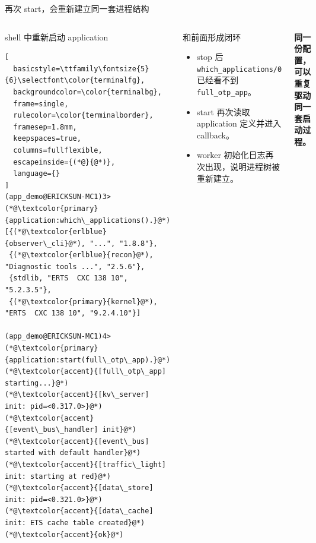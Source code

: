 \documentclass[aspectratio=169, 9pt]{beamer}
\newcommand{\good}[1]{\textbf{\color{accent!80!black}#1}}
\newcommand{\code}[1]{\texttt{#1}}
\begin{document}
\begin{frame}[fragile]{再次 start，会重新建立同一套进程结构}
  \begin{columns}[T,onlytextwidth]
    \begin{block}{shell 中重新启动 application}
\begin{lstlisting}[
  basicstyle=\ttfamily\fontsize{5}{6}\selectfont\color{terminalfg},
  backgroundcolor=\color{terminalbg},
  frame=single,
  rulecolor=\color{terminalborder},
  framesep=1.8mm,
  keepspaces=true,
  columns=fullflexible,
  escapeinside={(*@}{@*)},
  language={}
]
(app_demo@ERICKSUN-MC1)3> (*@\textcolor{primary}{application:which\_applications().}@*)
[{(*@\textcolor{erlblue}{observer\_cli}@*), "...", "1.8.8"},
 {(*@\textcolor{erlblue}{recon}@*), "Diagnostic tools ...", "2.5.6"},
 {stdlib, "ERTS  CXC 138 10", "5.2.3.5"},
 {(*@\textcolor{primary}{kernel}@*), "ERTS  CXC 138 10", "9.2.4.10"}]

(app_demo@ERICKSUN-MC1)4> (*@\textcolor{primary}{application:start(full\_otp\_app).}@*)
(*@\textcolor{accent}{[full\_otp\_app] starting...}@*)
(*@\textcolor{accent}{[kv\_server] init: pid=<0.317.0>}@*)
(*@\textcolor{accent}{[event\_bus\_handler] init}@*)
(*@\textcolor{accent}{[event\_bus] started with default handler}@*)
(*@\textcolor{accent}{[traffic\_light] init: starting at red}@*)
(*@\textcolor{accent}{[data\_store] init: pid=<0.321.0>}@*)
(*@\textcolor{accent}{[data\_cache] init: ETS cache table created}@*)
(*@\textcolor{accent}{ok}@*)
\end{lstlisting}
    \end{block}
    \footnotesize
    \begin{block}{和前面形成闭环}
      \begin{itemize}
        \item stop 后 \code{which\_applications/0} 已经看不到 \code{full\_otp\_app}。
        \item start 再次读取 application 定义并进入 callback。
        \item worker 初始化日志再次出现，说明进程树被重新建立。
      \end{itemize}
    \end{block}
    \vspace{0.15cm}
    \centering
    \good{同一份配置，可以重复驱动同一套启动过程。}
  \end{columns}
\end{frame}
\end{document}
